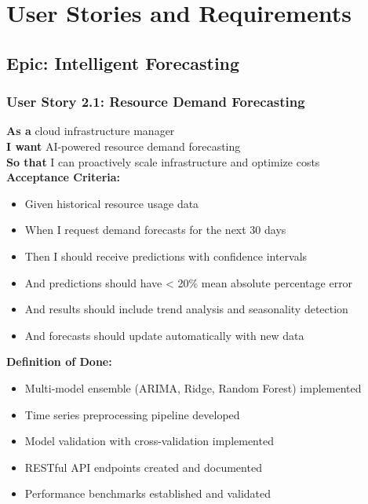 \section{User Stories and Requirements}

\subsection{Epic: Intelligent Forecasting}

\subsubsection{User Story 2.1: Resource Demand Forecasting}

\begin{tcolorbox}[colback=lightgray, colframe=primaryblue, title=US-2.1: Resource Demand Forecasting]
\textbf{As a} cloud infrastructure manager \\
\textbf{I want} AI-powered resource demand forecasting \\
\textbf{So that} I can proactively scale infrastructure and optimize costs \\

\textbf{Acceptance Criteria:}
\begin{itemize}
    \item Given historical resource usage data
    \item When I request demand forecasts for the next 30 days
    \item Then I should receive predictions with confidence intervals
    \item And predictions should have < 20\% mean absolute percentage error
    \item And results should include trend analysis and seasonality detection
    \item And forecasts should update automatically with new data
\end{itemize}

\textbf{Definition of Done:}
\begin{itemize}
    \item Multi-model ensemble (ARIMA, Ridge, Random Forest) implemented
    \item Time series preprocessing pipeline developed
    \item Model validation with cross-validation implemented
    \item RESTful API endpoints created and documented
    \item Performance benchmarks established and validated
\end{itemize}
\end{tcolorbox}

